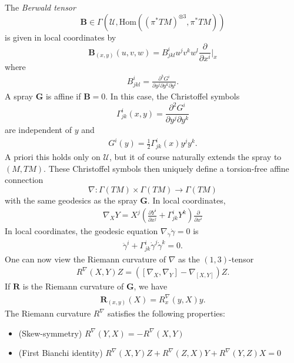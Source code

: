 \documentclass{article}
\newcommand{\bG}{\mathbf{G}}
\numberwithin{equation}{section}
\theoremstyle{plain}
\begin{document}
The \emph{Berwald tensor} 
\begin{equation}
\mathbf B \in \Gamma(\mathcal U, \mathrm{Hom}((\pi^* TM)^{\otimes 3}, \pi^* TM))
\end{equation}
 is given in local coordinates by 
 \begin{equation}
 \mathbf B_{(x,y)}(u,v,w) = B_{jkl}^i u^j v^k w^l \frac{\partial}{\partial x^i}|_x
 \end{equation}
  where 
\begin{align}
    B^i_{jkl} = \frac{\partial^3 G^i}{\partial y^j \partial y^k \partial y^l}.
\end{align}
A spray $\bG$ is affine if $\mathbf B = 0$. In this case, the Christoffel symbols 
\begin{equation}
\Gamma_{jk}^i(x,y) = \frac{\partial^2 G^i}{\partial y^j \partial y^k}
\end{equation}
 are independent of $y$ and 
\begin{align}
    G^i(y) = \frac{1}{2} \Gamma^i_{jk}(x) y^j y^k. 
\end{align}
A priori this holds only on $\mathcal U$, but it of course naturally extends the spray to $(M, TM)$. 
These Christoffel symbols then uniquely define a torsion-free affine connection 
\begin{equation}
\nabla : \Gamma(TM) \times \Gamma(TM) \to \Gamma(TM)
\end{equation}
 with the same geodesics as the spray $\bG$. In local coordinates, 
\begin{align}
    \nabla_X Y = X^j (\frac{\partial Y^i}{\partial x^j} + \Gamma_{jk}^i Y^k) \frac{\partial}{\partial x^i}
\end{align}
In local coordinates, the geodesic equation $\nabla_{\dot \gamma} \dot \gamma = 0$ is 
\begin{align}
    \ddot \gamma^i + \Gamma_{jk}^i \dot \gamma^j \dot \gamma^k = 0.
\end{align}
One can now view the Riemann curvature of $\nabla$ as the $(1,3)$-tensor
\begin{align}\label{eq: affine riemann tensor formula}
    R^\nabla(X,Y)Z = ([\nabla_X, \nabla_Y] - \nabla_{[X,Y]})Z. 
\end{align}
If $\mathbf R$ is the Riemann curvature of $\bG$, we have 
\begin{align}
    \mathbf R_{(x,y)}(X) = R_x^\nabla(y,X)y.  
\end{align}
The Riemann curvature $R^\nabla$ satisfies the following properties: 
\begin{itemize}
    \item (Skew-symmetry) $R^\nabla(Y,X) = -R^\nabla(X,Y)$ 
    \item (First Bianchi identity) $R^\nabla(X,Y)Z + R^\nabla(Z,X)Y + R^\nabla(Y,Z)X = 0$
\end{itemize}
\end{document}
